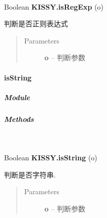 \documentclass[letterpaper,10pt,english]{sphinxmanual}
\begin{document}
\begin{fulllineitems}
\label{api/seed/lang/isRegExp:Lang.KISSY.isRegExp}~
\begin{DUlineblock}{0em}
\item[] Boolean \textbf{KISSY.isRegExp} (o)
\item[] 判断是否正则表达式
\end{DUlineblock}
\begin{quote}\begin{description}
\item[{Parameters}] \leavevmode
\textbf{o} -- 判断参数

\end{description}\end{quote}

\end{fulllineitems}



\paragraph{isString}
\label{api/seed/lang/isString:isstring}\label{api/seed/lang/isString::doc}

\subparagraph{Module}
\label{api/seed/lang/isString:module}\begin{quote}

{\hyperref[api/seed/lang/index:module-Lang]{}}
\end{quote}


\subparagraph{Methods}
\label{api/seed/lang/isString:methods}

\begin{fulllineitems}
\label{api/seed/lang/isString:Lang.KISSY.isString}~
\begin{DUlineblock}{0em}
\item[] Boolean \textbf{KISSY.isString} (o)
\item[] 判断是否字符串.
\end{DUlineblock}
\begin{quote}\begin{description}
\item[{Parameters}] \leavevmode
\textbf{o} -- 判断参数

\end{description}\end{quote}

\end{fulllineitems}
\end{document}
